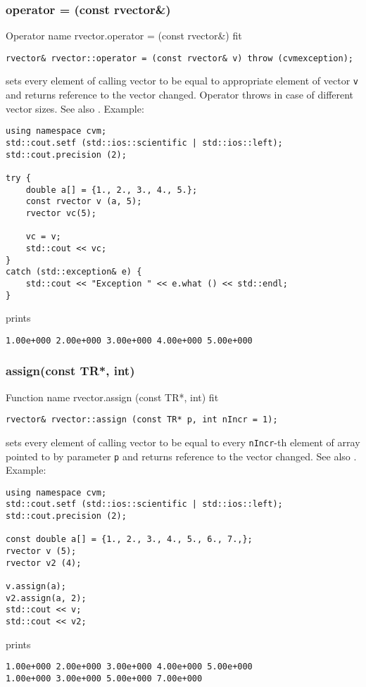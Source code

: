\subsubsection{operator = (const rvector\&)}
Operator%
\pdfdest name {rvector.operator = (const rvector&)} fit
\begin{verbatim}
rvector& rvector::operator = (const rvector& v) throw (cvmexception);
\end{verbatim}
sets every element of calling vector to be equal to
appropriate element of vector \verb"v"
and returns  reference to
the vector changed.
Operator throws  
in case of different vector sizes.
See also .
Example:
\begin{Verbatim}
using namespace cvm;
std::cout.setf (std::ios::scientific | std::ios::left); 
std::cout.precision (2);

try {
    double a[] = {1., 2., 3., 4., 5.};
    const rvector v (a, 5);
    rvector vc(5);

    vc = v;
    std::cout << vc;
}
catch (std::exception& e) {
    std::cout << "Exception " << e.what () << std::endl;
}
\end{Verbatim}
prints
\begin{Verbatim}
1.00e+000 2.00e+000 3.00e+000 4.00e+000 5.00e+000
\end{Verbatim}
\newpage



\subsubsection{assign(const TR*, int)}
Function%
\pdfdest name {rvector.assign (const TR*, int)} fit
\begin{verbatim}
rvector& rvector::assign (const TR* p, int nIncr = 1);
\end{verbatim}
sets every element of calling vector to be equal to
every \verb"nIncr"-th element of  array pointed to by parameter \verb"p"
and returns  reference to the vector changed.
See also .
Example:
\begin{Verbatim}
using namespace cvm;
std::cout.setf (std::ios::scientific | std::ios::left); 
std::cout.precision (2);

const double a[] = {1., 2., 3., 4., 5., 6., 7.,};
rvector v (5);
rvector v2 (4);

v.assign(a);
v2.assign(a, 2);
std::cout << v;
std::cout << v2;
\end{Verbatim}
prints
\begin{Verbatim}
1.00e+000 2.00e+000 3.00e+000 4.00e+000 5.00e+000
1.00e+000 3.00e+000 5.00e+000 7.00e+000
\end{Verbatim}
\newpage


